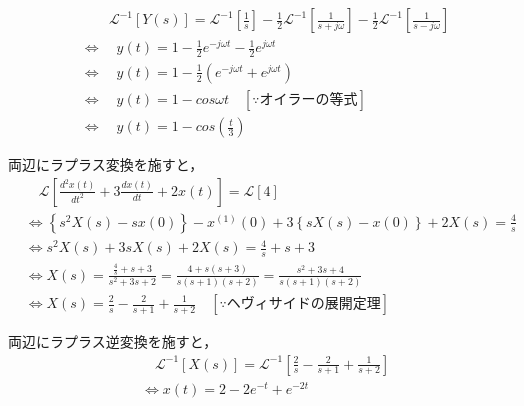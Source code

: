 \documentclass[a4paper,12pt]{article}
\begin{document}
\begin{tcolorbox}[title={[8] 次の微分方程式をラプラス変換を用いて解け.
\[
    9 \frac{d^2 y(t)}{dt^2} + y(t) = 1 
\]
\quad ただし，初期値は，$y(0) = 0,\ y'(0) = 0$ とする．
}]
\begin{align*}
    &\qquad  \mathcal{L}^{-1} \left[ Y(s) \right]
    = \mathcal{L}^{-1} \left[ \frac{1}{s} \right] 
    - \frac{1}{2} \mathcal{L}^{-1} \left[\frac{1}{s + j \omega} \right]
    - \frac{1}{2} \mathcal{L}^{-1} \left[\frac{1}{s - j \omega} \right] \\
    &\Leftrightarrow \quad y(t) 
    = 1 - \frac{1}{2} e^{-j \omega t} - \frac{1}{2} e^{j \omega t} \\
    &\Leftrightarrow \quad y(t) 
    = 1 - \frac{1}{2} \left( e^{-j \omega t} + e^{j \omega t} \right) \\
    &\Leftrightarrow \quad y(t) 
    = 1 - cos{\omega t} \quad \left[ \because オイラーの等式 \right]\\
    &\Leftrightarrow \quad y(t) 
    = 1 - cos \left(\frac{t}{3}\right)
\end{align*}



\vspace{2mm}
\end{tcolorbox}
\begin{tcolorbox}[title={[9] つぎの微分方程式をラプラス変換を用いて解け．
\[
\frac{d^2 x(t)}{dt^2} + 3 \frac{dx(t)}{dt} + 2x(t) = 4
\]
\quad ただし，初期条件は，$x(0)=1,\ x^{(1)}(0)=0$ とする． }]

\quad 両辺にラプラス変換を施すと，
\vspace{-3mm}
\begin{align*}
&\quad \mathcal{L} \left[ \frac{d^2 x(t)}{dt^2} + 3 \frac{dx(t)}{dt} + 2x(t) \right]
= \mathcal{L} \left[ 4 \right] \\
&\Leftrightarrow \left\{s^2 X(s) - sx(0)\right\} - x^{(1)}(0) + 3\left\{sX(s) - x(0) \right\} + 2X(s) = \frac{4}{s} \\
&\Leftrightarrow s^2 X(s) + 3sX(s) + 2X(s) = \frac{4}{s} + s + 3 \\
&\Leftrightarrow X(s) = \frac{\frac{4}{s} + s + 3}{s^2 + 3s + 2} = \frac{4 + s(s + 3)}{s(s + 1)(s + 2)} = \frac{s^2 + 3s + 4}{s(s + 1)(s + 2)} \\
&\Leftrightarrow X(s) = \frac{2}{s} - \frac{2}{s+1} + \frac{1}{s+2} \quad \left[ \because ヘヴィサイドの展開定理 \right]
\end{align*}

\quad 両辺にラプラス逆変換を施すと，
\vspace{-3mm}
\begin{align*}
&\quad \mathcal{L}^{-1} \left[ X(s) \right] 
= \mathcal{L}^{-1} \left[ \frac{2}{s} - \frac{2}{s+1} + \frac{1}{s+2} \right] \\
&\Leftrightarrow x(t) = 2 - 2e^{-t} + e^{-2t}
\end{align*}



\vspace{2mm}
\end{tcolorbox}
\end{document}
